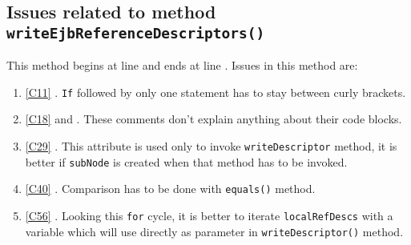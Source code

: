 \subsection{Issues related to method \texttt{writeEjbReferenceDescriptors()}}
This method begins at line  and ends at line \codeline{}. Issues in this method are:
\begin{enumerate}
\item \ref{C11} . \texttt{If} followed by only one statement has to stay between curly brackets.
\item \ref{C18}  and . These comments don't explain anything about their code blocks.
\item \ref{C29} . This attribute is used only to invoke \texttt{writeDescriptor} method, it is better if \texttt{subNode} is created when that method has to be invoked.
\item \ref{C40} . Comparison has to be done with \texttt{equals()} method.
\item \ref{C56} . Looking this \texttt{for} cycle, it is better to iterate \texttt{localRefDescs} with a variable which will use directly as parameter in \texttt{writeDescriptor()} method.   
\end{enumerate}